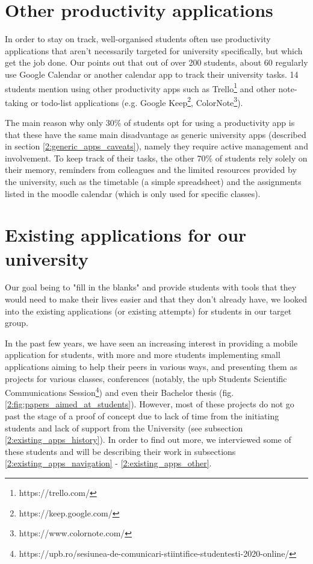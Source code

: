 \section{Other productivity applications} \label{2:other_apps}
    In order to stay on track, well-organised students often use productivity applications that aren't necessarily targeted for university specifically, but which get the job done. Our \textbf{} points out that out of over 200 students, about 60 regularly use Google Calendar or another calendar app to track their university tasks. 14 students mention using other productivity apps such as Trello\footnote{https://trello.com/} and other note-taking or todo-list applications (e.g. Google Keep\footnote{https://keep.google.com/}, ColorNote\footnote{https://www.colornote.com/}).
    
    The main reason why only 30\% of students opt for using a productivity app is that these have the same main disadvantage as generic university apps (described in section \ref{2:generic_apps_caveats}), namely they require active management and involvement. To keep track of their tasks, the other 70\% of students rely solely on their memory, reminders from colleagues and the limited resources provided by the university, such as the timetable (a simple spreadsheet) and the assignments listed in the \gls{moodle} calendar (which is only used for specific classes).

\section{Existing applications for our university} \label{2:existing_apps}
    Our goal being to "fill in the blanks" and provide students with tools that they would need to make their lives easier and that they don't already have, we looked into the existing applications (or existing attempts) for students in our target group.
    
    In the past few years, we have seen an increasing interest in providing a mobile application for students, with more and more students implementing small applications aiming to help their peers in various ways, and presenting them as projects for various classes, conferences (notably, the \acrshort{upb} Students Scientific Communications Session\footnote{https://upb.ro/sesiunea-de-comunicari-stiintifice-studentesti-2020-online/}) and even their Bachelor thesis (fig. \ref{2:fig:papers_aimed_at_students}). However, most of these projects do not go past the stage of a proof of concept due to lack of time from the initiating students and lack of support from the University (see subsection \ref{2:existing_apps_history}). In order to find out more, we interviewed some of these students and will be describing their work in subsections \ref{2:existing_apps_navigation} - \ref{2:existing_apps_other}.
    
